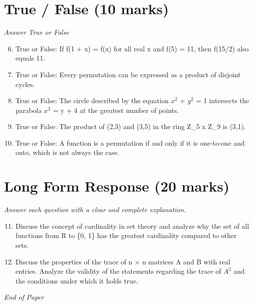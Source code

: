 \documentclass[12pt]{article}
\begin{document}
\section*{True / False (10 marks)}
\textit{Answer True or False}
\begin{enumerate}[label=\arabic*.]
\setcounter{enumi}{5}
\item True or False: If f(1 + x) = f(x) for all real x and f(5) = 11, then f(15/2) also equals 11.
\item True or False: Every permutation can be expressed as a product of disjoint cycles.
\item True or False: The circle described by the equation $x^2$ + $y^2$ = 1 intersects the parabola $x^2$ = y + 4 at the greatest number of points.
\item True or False: The product of (2,3) and (3,5) in the ring Z\_5 x Z\_9 is (3,1).
\item True or False: A function is a permutation if and only if it is one-to-one and onto, which is not always the case.
\end{enumerate}

\section*{Long Form Response (20 marks)}
\textit{Answer each question with a clear and complete explanation.}
\begin{enumerate}[label=\arabic*.]
\setcounter{enumi}{10}
\item Discuss the concept of cardinality in set theory and analyze why the set of all functions from R to \{0, 1\} has the greatest cardinality compared to other sets.
\item Discuss the properties of the trace of n \ensuremath{\times} n matrices A and B with real entries. Analyze the validity of the statements regarding the trace of $A^2$ and the conditions under which it holds true.
\end{enumerate}

\vfill
\noindent\textit{End of Paper}
\end{document}

